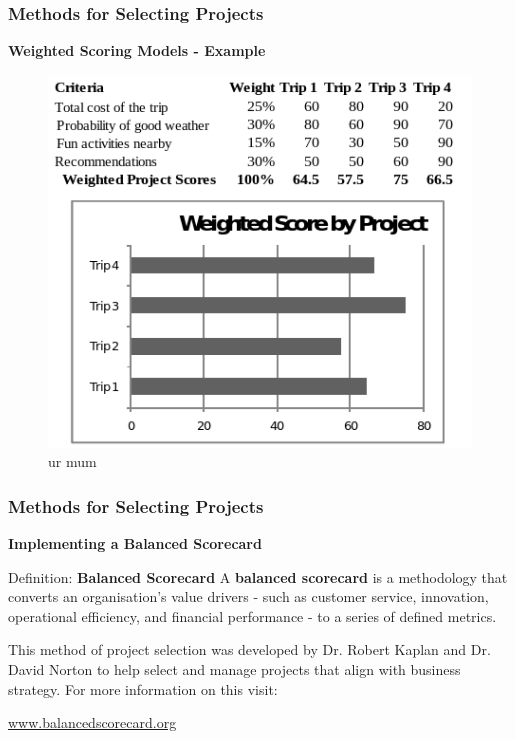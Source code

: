 \documentclass{beamer}
\begin{document}
\begin{frame}
\frametitle{Methods for Selecting Projects}
\textbf{Weighted Scoring Models - Example}\\
\vspace{0.5cm}
\begin{figure}
\includegraphics[scale=0.4]{weighted_scoring}
\caption{ur mum}
\end{figure}
\end{frame}
\begin{frame}
\frametitle{Methods for Selecting Projects}
\textbf{Implementing a Balanced Scorecard}\\
\vspace{0.5cm}
\begin{block}{Definition: \textbf{Balanced Scorecard}}
A \textbf{balanced scorecard} is a methodology that converts an organisation's value drivers - such as customer service, innovation, operational efficiency, and financial performance - to a series of defined metrics.
\end{block}
\vspace{0.5cm}
This method of project selection was developed by Dr. Robert Kaplan and Dr. David Norton to help select and manage projects that align with business strategy. For more information on this visit:
\begin{center}
\url{www.balancedscorecard.org}
\end{center}
\end{frame}
\end{document}
